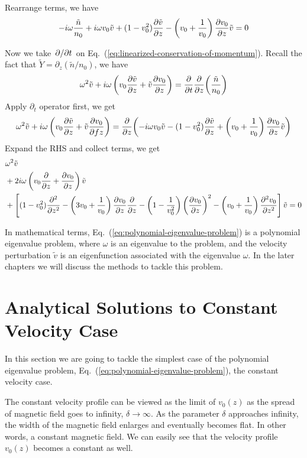 Rearrange terms, we have
\[
	-i\omega\frac{\tilde{n}}{n_0}
	+ i\omega v_0\tilde{v}
	+ (1-v_0^2)\pdv{\tilde{v}}{z}
	- \left(v_0+\frac{1}{v_0}\right)\pdv{v_0}{z}\tilde{v} = 0
\]

Now we take $\pdv*{t}$ on Eq.~(\ref{eq:linearized-conservation-of-momentum}). Recall the fact that $\tilde{Y} = \partial_z(\tilde{n}/n_0)$, we have
\[
	\omega^2\tilde{v} + i\omega\left(v_0\pdv{\tilde{v}}{z} + \tilde{v}\pdv{v_0}{z}\right)
	= \pdv{t}\pdv{z}(\frac{\tilde{n}}{n_0})
\]
Apply $\partial_t$ operator first, we get
\[
	\omega^2\tilde{v} + i\omega\left(v_0\pdv{\tilde{v}}{z} + \tilde{v}\pdv{v_0}{fz}\right)
	= \pdv{z}(-i\omega v_0\tilde{v}
	- (1-v_0^2)\pdv{\tilde{v}}{z}
	+ \left(v_0+\frac{1}{v_0}\right)\pdv{v_0}{z}\tilde{v})
\]
Expand the RHS and collect terms, we get
\begin{equation} \label{eq:polynomial-eigenvalue-problem}
	\begin{aligned}
		 & \omega^2 \tilde{v}                                          \\
		 & +2i\omega\left(v_0\pdv{}{z} + \pdv{v_0}{z}\right) \tilde{v} \\
		 & +\left[ (1-v_0^2)\pdv[2]{}{z}
			-\left(3v_0 + \frac{1}{v_0}\right)\pdv{v_0}{z}\pdv{}{z}
			- \left(1-\frac{1}{v_0^2}\right)\left(\pdv{v_0}{z}\right)^2
			- \left(v_0+\frac{1}{v_0}\right)\pdv[2]{v_0}{z} \right]\tilde{v}
		= 0
	\end{aligned}
\end{equation}

In mathematical terms, Eq.~(\ref{eq:polynomial-eigenvalue-problem}) is a polynomial eigenvalue problem, where $\omega$ is an eigenvalue to the problem, and the velocity perturbation $\tilde{v}$ is an eigenfunction associated with the eigenvalue $\omega$. In the later chapters we will discuss the methods to tackle this problem.

\section{Analytical Solutions to Constant Velocity Case}
In this section we are going to tackle the simplest case of the polynomial eigenvalue problem, Eq.~(\ref{eq:polynomial-eigenvalue-problem}), the constant velocity case.

The constant velocity profile can be viewed as the limit of $v_0(z)$ as the spread of magnetic field goes to infinity, $\delta\to\infty$. As the parameter $\delta$ approaches infinity, the width of the magnetic field enlarges and eventually becomes flat. In other words, a constant magnetic field. We can easily see that the velocity profile $v_0(z)$ becomes a constant as well.

